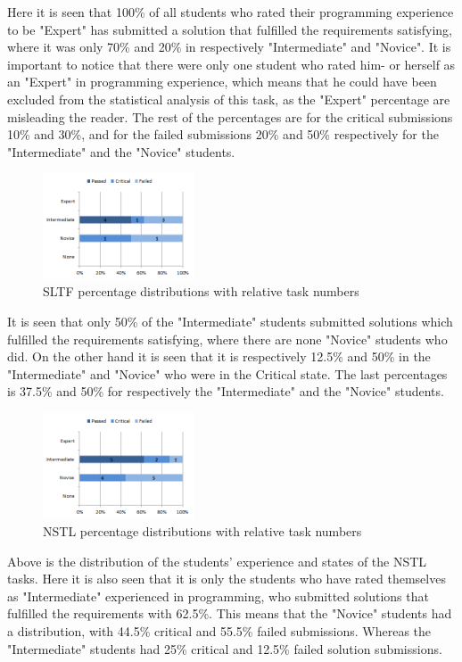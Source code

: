 \documentclass{sig-alternate-05-2015}
\begin{document}
Here it is seen that 100\% of all students who rated their programming experience to be "Expert" has submitted a solution that fulfilled the requirements satisfying, where it was only 70\% and 20\% in respectively "Intermediate" and "Novice".
It is important to notice that there were only one student who rated him- or herself as an "Expert" in programming experience, which means that he could have been excluded from the statistical analysis of this task, as the "Expert" percentage are misleading the reader. The rest of the percentages are for the critical submissions 10\% and 30\%, and for the failed submissions 20\% and 50\% respectively for the "Intermediate" and the "Novice" students.

\begin{figure}[H]
	\centering
	\includegraphics[width=0.4\textwidth]{img07}
	\caption{SLTF percentage distributions with relative task numbers}
\end{figure}

It is seen that only 50\% of the "Intermediate" students submitted solutions which fulfilled the requirements satisfying, where there are none "Novice" students who did. On the other hand it is seen that it is respectively 12.5\% and 50\% in the "Intermediate" and "Novice" who were in the Critical state. The last percentages is 37.5\% and 50\% for respectively the "Intermediate" and the "Novice" students.

\begin{figure}[H]
	\centering
	\includegraphics[width=0.4\textwidth]{img08}
	\caption{NSTL percentage distributions with relative task numbers}
\end{figure}

Above is the distribution of the students' experience and states of the NSTL tasks. Here it is also seen that it is only the students who have rated themselves as "Intermediate" experienced in programming, who submitted solutions that fulfilled the requirements with 62.5\%. This means that the "Novice" students had a distribution, with 44.5\% critical and 55.5\% failed submissions. Whereas the "Intermediate" students had 25\% critical and 12.5\% failed solution submissions.
\end{document}
